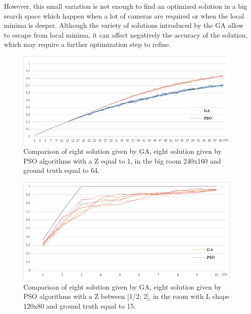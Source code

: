 However, this small variation is not enough to find an optimized solution in a big search space which happen when a lot of cameras are required or when the local minima is deeper. Although the variety of solutions introduced by the GA allow to escape from local minima, it can affect negatively the accuracy of the solution, which may require a further optimization step to refine. 





\begin{figure}[!htb]
  \includegraphics[width=\linewidth]{figures/GAPSObigRoomz1ters.png}
  \caption{ Comparison of  eight solution given by GA,  eight solution given by PSO algorithms with a Z equal to 1, in the big room 240x160 and ground truth equal to 64.}\label{fig:bigRz1}
   \endminipage\hfill
\end{figure}

\vfill
\hfill

\begin{figure}[!htb]
  \includegraphics[width=\linewidth]{figures/GAPSORoomLz2bis.png}
  \caption{Comparison of eight solution given by GA, eight solution given by PSO algorithms with a Z between [1/2; 2], in the room with L shape 120x80 and ground truth equal to 15.}\label{fig:RLz2}
   \endminipage\hfill
\end{figure}


